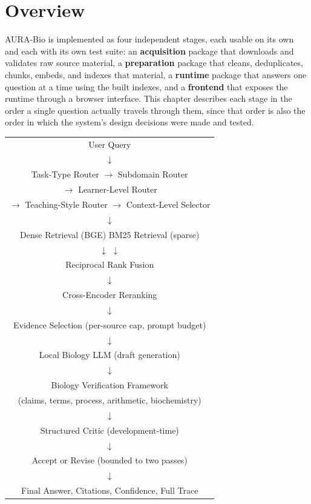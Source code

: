 \section{Overview}\label{3.1}

AURA-Bio is implemented as four independent stages, each usable on its own
and each with its own test suite: an \textbf{acquisition} package that
downloads and validates raw source material, a \textbf{preparation}
package that cleans, deduplicates, chunks, embeds, and indexes that
material, a \textbf{runtime} package that answers one question at a time
using the built indexes, and a \textbf{frontend} that exposes the runtime
through a browser interface. This chapter describes each stage in the
order a single question actually travels through them, since that order is
also the order in which the system's design decisions were made and
tested.

\begin{center}
\footnotesize\ttfamily
\begin{tabular}{c}
User Query \\
$\downarrow$ \\
Task-Type Router $\rightarrow$ Subdomain Router \\
$\rightarrow$ Learner-Level Router \\
$\rightarrow$ Teaching-Style Router $\rightarrow$ Context-Level Selector \\
$\downarrow$ \\
Dense Retrieval (BGE) \hspace{0.6cm} BM25 Retrieval (sparse) \\
$\downarrow$ \hspace{2.2cm} $\downarrow$ \\
Reciprocal Rank Fusion \\
$\downarrow$ \\
Cross-Encoder Reranking \\
$\downarrow$ \\
Evidence Selection (per-source cap, prompt budget) \\
$\downarrow$ \\
Local Biology LLM (draft generation) \\
$\downarrow$ \\
Biology Verification Framework \\
(claims, terms, process, arithmetic, biochemistry) \\
$\downarrow$ \\
Structured Critic (development-time) \\
$\downarrow$ \\
Accept or Revise (bounded to two passes) \\
$\downarrow$ \\
Final Answer, Citations, Confidence, Full Trace
\end{tabular}
\end{center}

